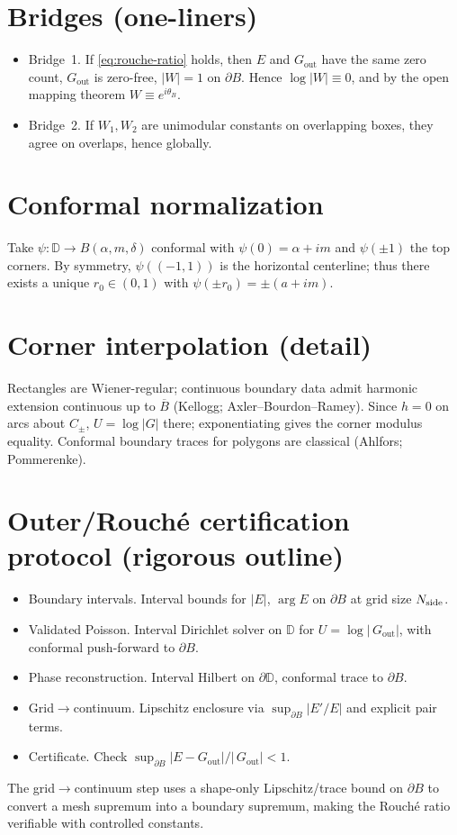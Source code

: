 \documentclass[11pt]{article}
\numberwithin{equation}{section}
\theoremstyle{remark}
\newcommand{\D}{\mathbb{D}}
\newcommand{\Gout}{G_{\mathrm{out}}}
\begin{document}
\section{Bridges (one-liners)}
\begin{itemize}
\item Bridge~1. If \eqref{eq:rouche-ratio} holds, then $E$ and $\Gout$ have the same zero count, $\Gout$ is zero-free, $|W|=1$ on $\partial B$. Hence $\log|W|\equiv 0$, and by the open mapping theorem $W\equiv e^{i\theta_B}$.
\item Bridge~2. If $W_1,W_2$ are unimodular constants on overlapping boxes, they agree on overlaps, hence globally.
\end{itemize}

\section{Conformal normalization}
Take $\psi:\D\to B(\alpha,m,\delta)$ conformal with $\psi(0)=\alpha+i m$ and $\psi(\pm 1)$ the top corners. By symmetry, $\psi((-1,1))$ is the horizontal centerline; thus there exists a unique $r_0\in(0,1)$ with $\psi(\pm r_0)=\pm(a+im)$.

\section{Corner interpolation (detail)}
Rectangles are Wiener-regular; continuous boundary data admit harmonic extension continuous up to $\overline B$ (Kellogg; Axler--Bourdon--Ramey). Since $h=0$ on arcs about $C_\pm$, $U=\log|G|$ there; exponentiating gives the corner modulus equality. Conformal boundary traces for polygons are classical (Ahlfors; Pommerenke).

\section{Outer/Rouch\'e certification protocol (rigorous outline)}\label{app:cert}
\begin{itemize}
\item Boundary intervals. Interval bounds for $|E|$, $\arg E$ on $\partial B$ at grid size $N_{\rm side}$.
\item Validated Poisson. Interval Dirichlet solver on $\D$ for $U=\log|\,\Gout|$, with conformal push-forward to $\partial B$.
\item Phase reconstruction. Interval Hilbert on $\partial\D$, conformal trace to $\partial B$.
\item Grid$\to$continuum. Lipschitz enclosure via $\sup_{\partial B}|E'/E|$ and explicit pair terms.
\item Certificate. Check $\sup_{\partial B}|E-\Gout|/|\,\Gout|<1$.
\end{itemize}
The grid$\to$continuum step uses a shape-only Lipschitz/trace bound on $\partial B$ to convert a mesh supremum into a boundary supremum, making the Rouch\'e ratio verifiable with controlled constants.
\end{document}
